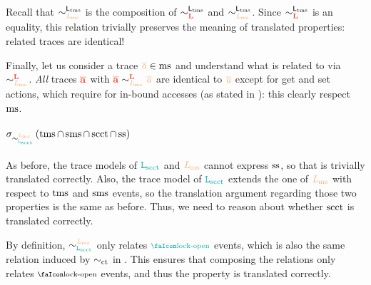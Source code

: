 \documentclass[acmsmall]{acmart}
\theoremstyle{definition}
\begin{document}
Recall that $\sim^{\Ltms}_{\Lms}$ is the composition of $\sim^{\Ltms}_{\Ltrg}$ and $\sim^{\Ltms}_{\Lms}$.
% 
Since $\sim^{\Ltms}_{\Ltrg}$ is an equality, this relation trivially preserves the meaning of translated properties: related traces are identical!

Finally, let us consider a trace $\irl{\trace}\in\mssafe$ and understand what is related to via $\sim^{\Ltrg}_{\Lms}$.
% 
{\em All} traces $\trg{\trace}$ with $\trg{\trace}\sim^{\Ltrg}_{\Lms}\irl{\trace}$ are identical to $\irl{\trace}$ except for get and set actions, which require for in-bound accesses (as stated in ): this clearly respect $\operatorname{ms}$.
% 





\paragraph{$\sigma_{\sim^{\Lms}_{\Lscct}}\left(\tmssafe\cap\smssafe\cap\scctsafe\cap\sssafe\right)$}

As before, the trace models of $\Lscct$ and $\Lms$ cannot express $\operatorname{ss}$, so that is trivially translated correctly.
% 
Also, the trace model of $\Lscct$ extends the one of $\Lms$ with respect to $\operatorname{tms}$ and $\operatorname{sms}$ events, so the translation argument regarding those two properties is the same as before.
% 
Thus, we need to reason about whether $\operatorname{scct}$ is translated correctly.

By definition, $\sim^{\Lms}_{\Lscct}$ only relates $\obj{\unlock}$ events, which is also the same relation induced by $\sim_{\operatorname{ct}}$ in .
% 
This ensures that composing the relations only relates $\unlock$ events, and thus the property is translated correctly.

\end{document}
